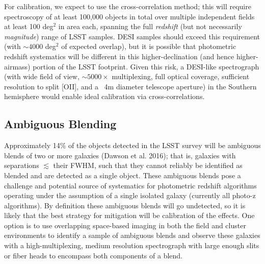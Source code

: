For calibration, we expect to use the cross-correlation method; this will require spectroscopy of at least 100,000 objects in total over multiple independent fields at least 100 deg$^2$ in area each, spanning the full {\em redshift} (but not necessarily {\em magnitude}) range of LSST samples.  DESI samples should exceed this requirement (with $\sim 4000$ deg$^2$ of expected overlap), but it is possible that photometric redshift systematics will be different in this higher-declination (and hence higher-airmass) portion of the LSST footprint.   Given this risk, a DESI-like spectrograph (with wide field of view, $\sim 5000\times$ multiplexing, full optical coverage, sufficient resolution to split [OII], and a ~4m diameter telescope aperture) in the Southern hemisphere would enable ideal calibration via cross-correlations.  


%
%


\subsection{Ambiguous Blending}
Approximately 14\% of the objects detected in the LSST survey will be ambiguous
blends of two or more galaxies (Dawson et al. 2016); that is, galaxies with
separations $\lesssim$ their FWHM, such that they cannot reliably be identified as blended and are detected as a single object. These ambiguous blends pose a challenge and
potential source of systematics for photometric redshift algorithms operating
under the assumption of a single isolated galaxy (currently all photo-z
algorithms). By definition these ambiguous blends will go undetected, so it is likely that the best strategy for mitigation will be calibration of the effects.  One option  is to use overlapping space-based imaging in both the field and cluster
environments to identify a sample of ambiguous blends and observe these galaxies
with a high-multiplexing, medium resolution spectrograph with large enough slits or fiber heads to encompass both components of a blend.

